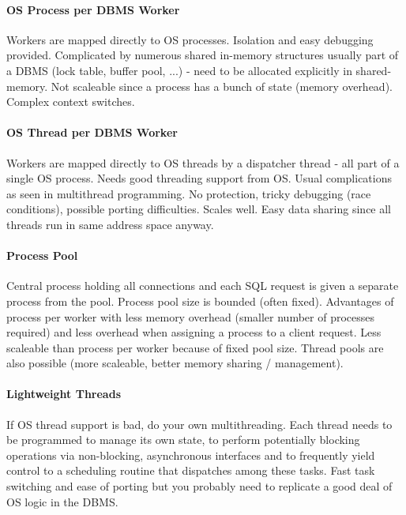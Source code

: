 \paragraph{OS Process per DBMS Worker}
Workers are mapped directly to OS processes. Isolation and easy debugging provided. Complicated by numerous shared in-memory structures usually part of a DBMS (lock table, buffer pool, ...) - need to be allocated explicitly in shared-memory. Not scaleable since a process has a bunch of state (memory overhead). Complex context switches.

\paragraph{OS Thread per DBMS Worker}
Workers are mapped directly to OS threads by a dispatcher thread - all part of a single OS process. Needs good threading support from OS. Usual complications as seen in multithread programming. No protection, tricky debugging (race conditions), possible porting difficulties. Scales well. Easy data sharing since all threads run in same address space anyway.

\paragraph{Process Pool}
Central process holding all connections and each SQL request is given a separate process from the pool. Process pool size is bounded (often fixed). Advantages of process per worker with less memory overhead (smaller number of processes required) and less overhead when assigning a process to a client request. Less scaleable than process per worker because of fixed pool size. Thread pools are also possible (more scaleable, better memory sharing / management). 

\paragraph{Lightweight Threads}
If OS thread support is bad, do your own multithreading. Each thread needs to be programmed to manage its own state, to perform potentially blocking operations via non-blocking, asynchronous interfaces and to frequently yield control to a scheduling routine that dispatches among these tasks. Fast task switching and ease of porting but you probably need to replicate a good deal of OS logic in the DBMS.

